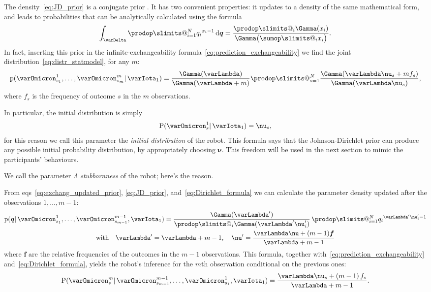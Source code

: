 \documentclass[\ifafour a4paper,12pt,\else a5paper,10pt,\fi%
onecolumn,oneside,article,%
british%
]{memoir}
\makeatletter
\theoremstyle{remark}
\theoremstyle{innote}
\def\sum{\DOTSI\sumop\slimits@}
\def\prod{\DOTSI\prodop\slimits@}
\renewcommand*{\cites}{\parencites}
\newcommand*{\di}{\mathrm{d}}%
\newcommand*{\pf}{\mathrm{p}}%
\newcommand*{\p}{\mathrm{P}}%
\renewcommand*{\|}{\mathpunct{|}}
\newcommand*{\chap}{ch.}%
\newcommand*{\eqns}{eqs}%
\newcommand*{\simpl}{\varDelta}
\newcommand*{\yqq}{q}
\newcommand*{\yq}{\bm{\yqq}}
\newcommand*{\yff}{f}
\newcommand*{\yf}{\bm{\yff}}
\newcommand*{\yI}{\varIota}
\newcommand*{\yO}{\varOmicron}
\newcommand*{\yMJ}{\yI_1}
\newcommand*{\yN}{\varLambda}
\newcommand*{\ynn}{\nu}
\newcommand*{\yn}{\bm{\nu}}
\makeatother
\begin{document}
The density~\eqref{eq:JD_prior} is a conjugate prior
\cites[\chap~9]{degroot1970_r2004}{diaconisetal1979b}. It has two
convenient properties: it updates to a density of the same mathematical
form, and leads to probabilities that can be analytically calculated using
the formula
\begin{equation}
  \label{eq:Dirichlet_formula}
  \int_{\simpl} \prod_{i=1}^N {\yqq_{i}}^{x_i-1}\,\di\yq = \frac{\prod_i \Gamma(x_i)}{\Gamma\bigl(\sum_i x_i\bigr)}.
\end{equation}
In fact, inserting this prior in the infinite-exchangeability
formula~\eqref{eq:prediction_exchangeability} we find the joint
distribution~\eqref{eq:distr_statmodel}, for any $m$:
\begin{equation}
  \label{eq:joint_distr_JD}
\pf( \yO^1_{s_1}, \dotsc, \yO^m_{s_m} \| \yMJ) =
  \frac{\Gamma(\yN)}{\Gamma(\yN+m)}
  \prod_{s=1}^{N}\frac{\Gamma(\yN\ynn_s + m\yff_s)}{\Gamma(\yN\ynn_s)},
\end{equation}
where $\yff_s$ is the frequency of outcome $s$ in the $m$ observations.

In particular, the initial distribution is simply
\begin{equation}
  \label{eq:initial_predictive_JD}
  \p(\yO^1_{s} \| \yMJ)  = \ynn_s,
\end{equation}
for this reason we call this parameter the \emph{initial distribution} of
the robot. This formula says that the Johnson-Dirichlet prior can produce
any possible initial probability distribution, by appropriately choosing
$\yn$. This freedom will be used in the next section to mimic the
participants' behaviours.

We call the parameter $\yN$ \emph{stubbornness} of the robot; here's the
reason.

From \eqns~\eqref{eq:exchang_updated_prior}, \eqref{eq:JD_prior},
and~\eqref{eq:Dirichlet_formula} we can calculate the parameter density
updated after the observations $1,\dotsc,m-1$:
\begin{multline}
  \label{eq:update_prior_JD}
  \pf(\yq \| \yO^1_{s_1}, \dotsc, \yO^{m-1}_{s_{m-1}}, \yMJ)
  = 
  \frac{\Gamma(\yN')}{\prod_i \Gamma(\yN'\ynn_i')}\,
  \prod_{i=1}^{N}{\yqq_i}^{\yN'\ynn_i'-1}
  \\
  \text{with}\quad \yN' =\yN+m-1,\quad
  \yn'=\frac{\yN\yn+(m-1)\yf}{\yN+m-1}
\end{multline}
where $\yf$ are the relative frequencies of the outcomes in the $m-1$
observations. This formula, together
with~\eqref{eq:prediction_exchangeability} and~\eqref{eq:Dirichlet_formula},
yields the robot's inference for the $m$th observation conditional on the
previous ones:
\begin{equation}
  \label{eq:predictive_JD_general}
  \p(\yO^{m}_{s} \| \yO^{m-1}_{s_{m-1}},\dotsc,\yO^1_{s_1}, \yMJ) =
\frac{\yN\ynn_s + (m-1)\,\yff_s}{\yN+m-1}.
\end{equation}
\end{document}
